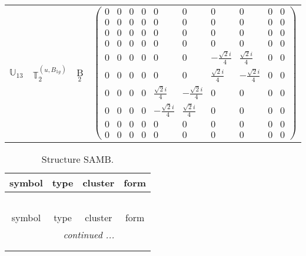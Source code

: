 \documentclass[fleqn,10pt,landscape]{article}
\begin{document}
\begin{itemize}
\begin{center}
\begin{longtable}{c|c|c|c}
$ \mathbb{U}_{13} $ & $\mathbb{T}_{2}^{(u,B_{1g})}$ & B$_{2}$ & $\begin{pmatrix} 0 & 0 & 0 & 0 & 0 & 0 & 0 & 0 & 0 & 0 \\ 0 & 0 & 0 & 0 & 0 & 0 & 0 & 0 & 0 & 0 \\ 0 & 0 & 0 & 0 & 0 & 0 & 0 & 0 & 0 & 0 \\ 0 & 0 & 0 & 0 & 0 & 0 & 0 & 0 & 0 & 0 \\ 0 & 0 & 0 & 0 & 0 & 0 & - \frac{\sqrt{2} i}{4} & \frac{\sqrt{2} i}{4} & 0 & 0 \\ 0 & 0 & 0 & 0 & 0 & 0 & \frac{\sqrt{2} i}{4} & - \frac{\sqrt{2} i}{4} & 0 & 0 \\ 0 & 0 & 0 & 0 & \frac{\sqrt{2} i}{4} & - \frac{\sqrt{2} i}{4} & 0 & 0 & 0 & 0 \\ 0 & 0 & 0 & 0 & - \frac{\sqrt{2} i}{4} & \frac{\sqrt{2} i}{4} & 0 & 0 & 0 & 0 \\ 0 & 0 & 0 & 0 & 0 & 0 & 0 & 0 & 0 & 0 \\ 0 & 0 & 0 & 0 & 0 & 0 & 0 & 0 & 0 & 0 \end{pmatrix}$ \\
\end{longtable}
\end{center}
\begin{center}
\renewcommand{\arraystretch}{1.3}
\begin{longtable}{c|c|c|c}
\caption{Structure SAMB.}
 \\
 \hline \hline
symbol & type & cluster & form \\ \hline \endfirsthead

\multicolumn{3}{l}{\tablename\ \thetable{}} \\
 \hline \hline
symbol & type & cluster & form \\ \hline \endhead

 \hline \hline
\multicolumn{3}{r}{\footnotesize\it continued ...} \\ \endfoot

 \hline \hline
\multicolumn{3}{r}{} \\ \endlastfoot


\end{longtable}
\end{center}
\end{itemize}
\end{document}
